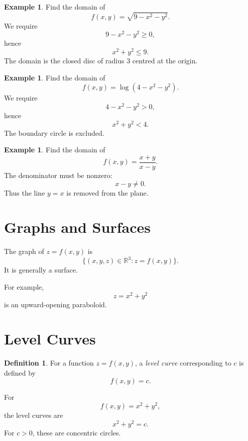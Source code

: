 \documentclass[11pt,oneside]{book}
\theoremstyle{studentthm}
\theoremstyle{definition}
\newtheorem{definition}[theorem]{Definition}
\newtheorem{example}[theorem]{Example}
\newcommand{\R}{\mathbb{R}}
\begin{document}
\begin{example}
Find the domain of
\[
f(x,y)=\sqrt{9-x^2-y^2}.
\]
We require
\[
9-x^2-y^2\ge0,
\]
hence
\[
x^2+y^2\le9.
\]
The domain is the closed disc of radius \(3\) centred at the origin.
\end{example}

\begin{example}
Find the domain of
\[
f(x,y)=\log(4-x^2-y^2).
\]
We require
\[
4-x^2-y^2>0,
\]
hence
\[
x^2+y^2<4.
\]
The boundary circle is excluded.
\end{example}

\begin{example}
Find the domain of
\[
f(x,y)=\frac{x+y}{x-y}.
\]
The denominator must be nonzero:
\[
x-y\ne0.
\]
Thus the line \(y=x\) is removed from the plane.
\end{example}

\section{Graphs and Surfaces}

The graph of \(z=f(x,y)\) is
\[
\{(x,y,z)\in\R^3:z=f(x,y)\}.
\]
It is generally a surface.

For example,
\[
z=x^2+y^2
\]
is an upward-opening paraboloid.

\begin{center}
\end{center}

\section{Level Curves}

\begin{definition}
For a function \(z=f(x,y)\), a \emph{level curve} corresponding to
\(c\) is defined by
\[
f(x,y)=c.
\]
\end{definition}

For
\[
f(x,y)=x^2+y^2,
\]
the level curves are
\[
x^2+y^2=c.
\]
For \(c>0\), these are concentric circles.

\begin{center}
\end{center}
\end{document}
